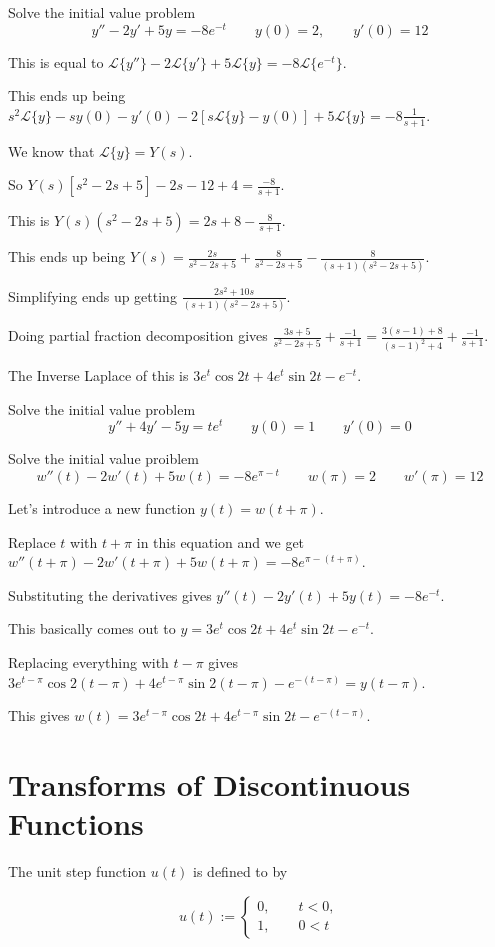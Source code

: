\documentclass[../diffeq.tex]{subfiles}
\begin{document}
\begin{example}
    Solve the initial value problem 
    \[ y''-2y'+5y=-8e^{-t}\qquad y(0)=2, \qquad y'(0)=12 \]

    This is equal to $\mathcal{L}\{y''\}-2\mathcal{L}\{y'\}+5\mathcal{L}\{y\}=-8\mathcal{L}\{e^{-t}\}$.

    This ends up being $s^2\mathcal{L}\{y\}-sy(0)-y'(0)-2[s\mathcal{L}\{y\}-y(0)]+5\mathcal{L}\{y\}=-8\frac{1}{s+1}$.

    We know that $\mathcal{L}\{y\}=Y(s)$.

    So $Y(s)[s^2-2s+5]-2s-12+4=\frac{-8}{s+1}$.

    This is $Y(s)(s^2-2s+5)=2s+8-\frac{8}{s+1}$.

    This ends up being $Y(s)=\frac{2s}{s^2-2s+5}+\frac{8}{s^2-2s+5}-\frac{8}{(s+1)(s^2-2s+5)}$.

    Simplifying ends up getting $\frac{2s^2+10s}{(s+1)(s^2-2s+5)}$.

    Doing partial fraction decomposition gives $\frac{3s+5}{s^2-2s+5}+\frac{-1}{s+1}=\frac{3(s-1)+8}{(s-1)^2+4}+\frac{-1}{s+1}$.

    The Inverse Laplace of this is $3e^t \cos 2t + 4e^t \sin 2t - e^{-t}$.
\end{example}

\ex Solve the initial value problem 
\[ y''+4y'-5y=te^t \qquad y(0)=1 \qquad y'(0)=0 \]

\begin{example}
    Solve the initial value proiblem 
    \[ w''(t)-2w'(t)+5w(t)=-8e^{\pi-t} \qquad w(\pi)=2 \qquad w'(\pi)=12 \]

    Let's introduce a new function $y(t)=w(t+\pi)$.

    Replace $t$ with $t+\pi$ in this equation and we get $w''(t+\pi)-2w'(t+\pi)+5w(t+\pi)=-8e^{\pi-(t+\pi)}$.

    Substituting the derivatives gives $y''(t)-2y'(t)+5y(t)=-8e^{-t}$.

    This basically comes out to $y=3e^t\cos 2t+4e^t \sin 2t - e^{-t}$.

    Replacing everything with $t-\pi$ gives $3e^{t-\pi}\cos 2(t-\pi)+4e^{t-\pi}\sin 2(t-\pi)-e^{-(t-\pi)}=y(t-\pi)$.

    This gives $w(t)=3e^{t-\pi}\cos 2t + 4e^{t-\pi}\sin 2t - e^{-(t-\pi)}$.
\end{example}

\section{Transforms of Discontinuous Functions}
\begin{definition}
    The unit step function $u(t)$ is defined to by 

    \[ u(t) := \begin{cases}
        0, \qquad t<0, \\
        1, \qquad 0<t 
    \end{cases}
    \]
\end{definition}
\end{document}
